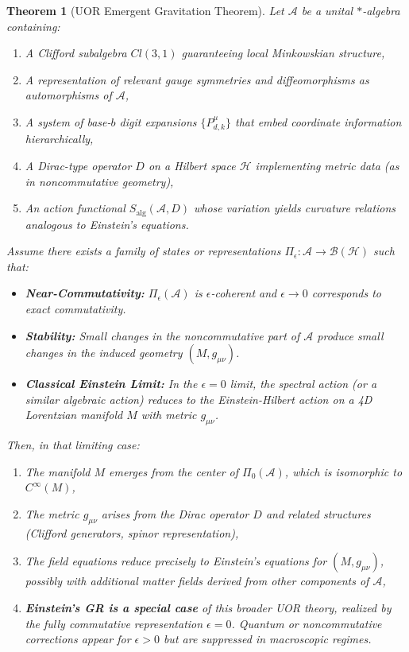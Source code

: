 \documentclass[11pt]{article}
\newtheorem{theorem}{Theorem}
\begin{document}
\begin{theorem}[UOR Emergent Gravitation Theorem]
\label{thm:UOR-Gravity}
Let $\mathcal{A}$ be a unital $*$-algebra containing:
\begin{enumerate}
\item A Clifford subalgebra $Cl(3,1)$ guaranteeing local Minkowskian structure,
\item A representation of relevant gauge symmetries and diffeomorphisms as automorphisms of $\mathcal{A}$,
\item A system of base-$b$ digit expansions $\{P_{d,k}^\mu\}$ that embed coordinate information hierarchically,
\item A Dirac-type operator $D$ on a Hilbert space $\mathcal{H}$ implementing metric data (as in noncommutative geometry),
\item An action functional $S_{\mathrm{alg}}(\mathcal{A},D)$ whose variation yields curvature relations analogous to Einstein’s equations.
\end{enumerate}
Assume there exists a family of states or representations $\Pi_\epsilon : \mathcal{A} \to \mathcal{B}(\mathcal{H})$ such that:
\begin{itemize}
\item[\textbf{(i)}] \textbf{Near-Commutativity:} $\Pi_\epsilon(\mathcal{A})$ is $\epsilon$-coherent and $\epsilon \to 0$ corresponds to exact commutativity.
\item[\textbf{(ii)}] \textbf{Stability:} Small changes in the noncommutative part of $\mathcal{A}$ produce small changes in the induced geometry $(M,g_{\mu\nu})$.
\item[\textbf{(iii)}] \textbf{Classical Einstein Limit:} In the $\epsilon=0$ limit, the spectral action (or a similar algebraic action) reduces to the Einstein-Hilbert action on a 4D Lorentzian manifold $M$ with metric $g_{\mu\nu}$.
\end{itemize}
Then, in that limiting case:
\begin{enumerate}
\item The manifold $M$ emerges from the center of $\Pi_0(\mathcal{A})$, which is isomorphic to $C^\infty(M)$,
\item The metric $g_{\mu\nu}$ arises from the Dirac operator $D$ and related structures (Clifford generators, spinor representation),
\item The field equations reduce precisely to Einstein’s equations for $(M, g_{\mu\nu})$, possibly with additional matter fields derived from other components of $\mathcal{A}$,
\item \textbf{Einstein's GR is a special case} of this broader UOR theory, realized by the fully commutative representation $\epsilon=0$. Quantum or noncommutative corrections appear for $\epsilon>0$ but are suppressed in macroscopic regimes.
\end{enumerate}
\end{theorem}
\end{document}
